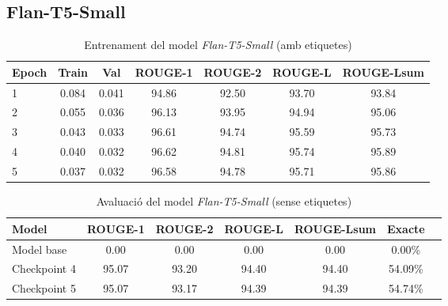 \subsection{Flan-T5-Small}
\begin{table}[H]
    \centering
    \begin{tabular}{lcccccc}
    \toprule
    Epoch & Train & Val & ROUGE-1 & ROUGE-2 & ROUGE-L & ROUGE-Lsum \\
    \midrule
    1 & 0.084 & 0.041 & 94.86 & 92.50 & 93.70 & 93.84 \\
    2 & 0.055 & 0.036 & 96.13 & 93.95 & 94.94 & 95.06 \\
    3 & 0.043 & 0.033 & 96.61 & 94.74 & 95.59 & 95.73 \\
    4 & 0.040 & 0.032 & 96.62 & 94.81 & 95.74 & 95.89 \\
    5 & 0.037 & 0.032 & 96.58 & 94.78 & 95.71 & 95.86 \\
    \bottomrule
    \end{tabular}
    \caption[Entrenament del model \textit{Flan-T5-Small}]{Entrenament del model \textit{Flan-T5-Small} (amb etiquetes)}
\end{table}

\begin{table}[H]
    \centering
    \begin{tabular}{lcccccc}
    \toprule
    Model & ROUGE-1 & ROUGE-2 & ROUGE-L & ROUGE-Lsum & Exacte \\
    \midrule
    Model base   & 0.00  & 0.00  & 0.00  & 0.00  & 0.00\% \\
    Checkpoint 4 & 95.07 & 93.20 & 94.40 & 94.40 & 54.09\% \\
    Checkpoint 5 & 95.07 & 93.17 & 94.39 & 94.39 & 54.74\% \\
    \bottomrule
    \end{tabular}
    \caption[Avaluació del model \textit{Flan-T5-Small}]{Avaluació del model \textit{Flan-T5-Small} (sense etiquetes)}
\end{table}







